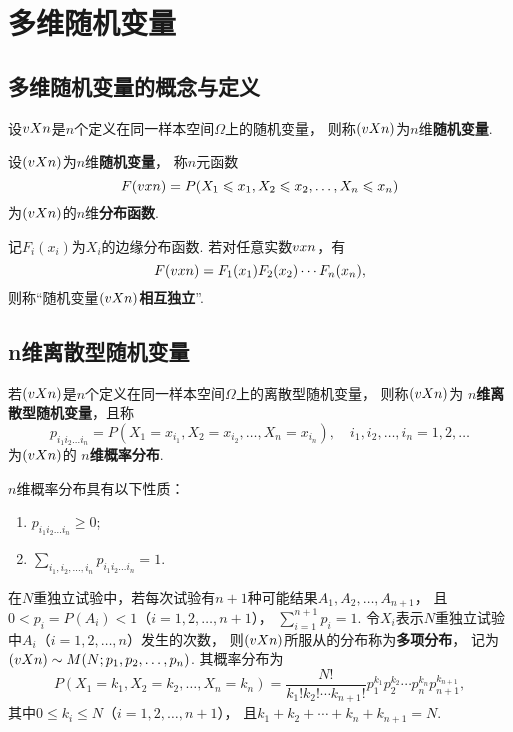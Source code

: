 \section{多维随机变量}

\subsection{多维随机变量的概念与定义}
\begin{definition}
设\(v{X}{n}\)是\(n\)个定义在同一样本空间\(\Omega\)上的随机变量，%
则称\((v{X}{n})\)为\(n\)维\textbf{随机变量}.
\end{definition}

\begin{definition}
设\((v{X}{n})\)为\(n\)维\textbf{随机变量}，%
称\(n\)元函数\[
F(v{x}{n})
= P(X_1 \leqslant x_1,X_2 \leqslant x_2,\dotsc,X_n \leqslant x_n)
\]为\((v{X}{n})\)的\(n\)维\textbf{分布函数}.
\end{definition}

\begin{definition}
记\(F_i(x_i)\)为\(X_i\)的边缘分布函数.
若对任意实数\(v{x}{n}\)，有\[
F(v{x}{n}) = F_1(x_1) F_2(x_2) \dotsm F_n(x_n),
\]则称“随机变量\((v{X}{n})\)\textbf{相互独立}”.
\end{definition}

\subsection{n维离散型随机变量}
\begin{definition}
若\((v{X}{n})\)是\(n\)个定义在同一样本空间\(\Omega\)上的离散型随机变量，%
则称\((v{X}{n})\)为\textbf{ \(n\)维离散型随机变量}，且称\[
p_{i_1 i_2 \dotso i_n}
= P(X_1=x_{i_1},X_2=x_{i_2},\dotsc,X_n=x_{i_n}),
\quad i_1,i_2,\dotsc,i_n=1,2,\dotsc
\]为\((v{X}{n})\)的\textbf{ \(n\)维概率分布}.
\end{definition}

\begin{property}
\(n\)维概率分布具有以下性质：
\begin{enumerate}
\item \(p_{i_1 i_2 \dotso i_n} \geqslant 0\);
\item \(\sum\limits_{i_1,i_2,\dotsc,i_n}{p_{i_1 i_2 \dotso i_n}} = 1\).
\end{enumerate}
\end{property}

\begin{definition}
在\(N\)重独立试验中，若每次试验有\(n+1\)种可能结果\(A_1,A_2,\dotsc,A_{n+1}\)，%
且\(0<p_i=P(A_i)<1\)（\(i=1,2,\dotsc,n+1\)），%
\(\sum\limits_{i=1}^{n+1}{p_i}=1\).
令\(X_i\)表示\(N\)重独立试验中\(A_i\)（\(i=1,2,\dotsc,n\)）发生的次数，%
则\((v{X}{n})\)所服从的分布称为\textbf{多项分布}，%
记为\((v{X}{n}) \sim M(N;p_1,p_2,\dotsc,p_n)\).
其概率分布为\[
P(X_1=k_1,X_2=k_2,\dotsc,X_n=k_n)
= \frac{N!}{k_1! k_2!\dotsm k_{n+1}!} p_1^{k_1} p_2^{k_2} \dotsm p_n^{k_n} p_{n+1}^{k_{n+1}},
\]
其中\(0 \leqslant k_i \leqslant N\)（\(i=1,2,\dotsc,n+1\)），%
且\(k_1 + k_2 + \dotsb + k_n + k_{n+1} = N\).
\end{definition}

